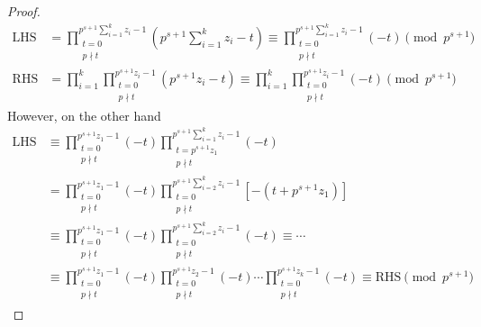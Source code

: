 \documentclass{treatise}
\begin{document}
\begin{proof}
\begin{align*}
\mbox{LHS} & = \prod_{\substack{t = 0 \\ p \nmid t}}^{p^{s + 1} \sum_{i = 1}^k z_i - 1} \left( p^{s + 1} \sum_{i = 1}^k z_i - t \right) \equiv \prod_{\substack{t = 0 \\ p \nmid t}}^{p^{s + 1} \sum_{i = 1}^k z_i - 1} (-t) \pmod{p^{s + 1}} \\
\mbox{RHS} & = \prod_{i = 1}^k \prod_{\substack{t = 0 \\ p \nmid t}}^{p^{s + 1} z_i - 1} (p^{s + 1} z_i - t) \equiv \prod_{i = 1}^k \prod_{\substack{t = 0 \\ p \nmid t}}^{p^{s + 1} z_i - 1} (-t) \pmod{p^{s + 1}}
\end{align*}
However, on the other hand
\begin{align*}
\mbox{LHS} & \equiv \prod_{\substack{t = 0 \\ p \nmid t}}^{p^{s + 1} z_1 - 1} (-t) \prod_{\substack{t = p^{s + 1} z_1 \\ p \nmid t}}^{p^{s + 1} \sum_{i = 1}^k z_i - 1} (-t)
\\
& = \prod_{\substack{t = 0 \\ p \nmid t}}^{p^{s + 1} z_1 - 1} (-t) \prod_{\substack{t = 0 \\ p \nmid t}}^{p^{s + 1} \sum_{i = 2}^k z_i - 1} [-(t + p^{s + 1} z_1)]
\\
& \equiv \prod_{\substack{t = 0 \\ p \nmid t}}^{p^{s + 1} z_1 - 1} (-t) \prod_{\substack{t = 0 \\ p \nmid t}}^{p^{s + 1} \sum_{i = 2}^k z_i - 1} (-t) \equiv \cdots
\\
& \equiv \prod_{\substack{t = 0 \\ p \nmid t}}^{p^{s + 1} z_1 - 1} (-t) \prod_{\substack{t = 0 \\ p \nmid t}}^{p^{s + 1} z_2 - 1} (-t) \cdots \prod_{\substack{t = 0 \\ p \nmid t}}^{p^{s + 1} z_k - 1} (-t) \equiv \mbox{RHS} \pmod{p^{s + 1}}
\end{align*}
\end{proof}
\ \\
\end{document}
